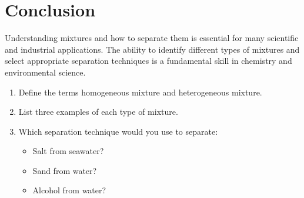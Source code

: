 \documentclass[justified,notoc]{tufte-book}
\newenvironment{tieredquestions}[1]{%
    \begin{tcolorbox}[colback=primary!5,colframe=primary,title=\textbf{Practice Questions - #1}]
}{%
    \end{tcolorbox}
}
\begin{document}
\FloatBarrier

\section{Conclusion}

Understanding mixtures and how to separate them is essential for many scientific and industrial applications. The ability to identify different types of mixtures and select appropriate separation techniques is a fundamental skill in chemistry and environmental science.

\begin{tieredquestions}{Basic}
\begin{enumerate}
    \item Define the terms homogeneous mixture and heterogeneous mixture.
    \item List three examples of each type of mixture.
    \item Which separation technique would you use to separate:
    \begin{itemize}
        \item Salt from seawater?
        \item Sand from water?
        \item Alcohol from water?
    \end{itemize}
\end{enumerate}
\end{tieredquestions}

\FloatBarrier
\end{document}
